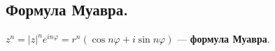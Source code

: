 \subsection{
    Формула Муавра.
}

$z^n = |z|^n e^{in\varphi} = r^n(\cos n \varphi + i \sin n \varphi)$ — \textbf{формула Муавра}.
